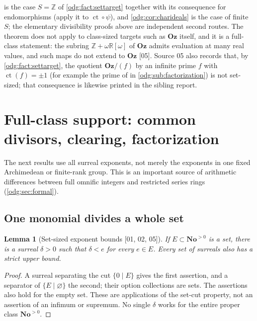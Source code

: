 \documentclass[11pt,oneside]{article}
\numberwithin{equation}{section}
\newtheorem{lemma}[lemma]{Lemma}
\theoremstyle{definition}
\theoremstyle{remark}
\newcommand{\No}{\mathbf{No}}
\newcommand{\Oz}{\mathbf{Oz}}
\newcommand{\Z}{\mathbb Z}
\newcommand{\R}{\mathbb R}
\newcommand{\ct}{\operatorname{ct}}
\newcommand{\src}[1]{\textup{\textsf{\small[#1]}}}
\begin{document}
 is the case $S=\Z$ of \cref{odg:fact:settarget}
together with its consequence for endomorphisms (apply it to
$\ct\circ\psi$), and \cref{odg:cor:charideals} is the case of finite $S$;
the elementary divisibility proofs above are independent second routes. The
theorem does not apply to class-sized targets such as $\Oz$ itself, and it is
a full-class statement: the subring $\Z+\omega\R[\omega]$ of $\Oz$ admits
evaluation at many real values, and such maps do not extend to $\Oz$
\src{05}. Source 05 also records that, by \cref{odg:fact:settarget}, the
quotient $\Oz/(f)$ by an infinite prime $f$ with $\ct(f)=\pm1$ (for example
the prime of \cite[Theorem B]{LM} in \cref{odg:sub:factorization}) is not
set-sized; that consequence is likewise printed in the sibling report.

\section{Full-class support: common divisors, clearing, factorization}\label{odg:sec:class}

The next results use all surreal exponents, not merely the exponents in one
fixed Archimedean or finite-rank group. This is an important source of
arithmetic differences between full omnific integers and restricted series
rings (\cref{odg:sec:formal}).

\subsection{One monomial divides a whole set}

\begin{lemma}[Set-sized exponent bounds \src{01, 02, 05}]\label{odg:lem:setbounds}
If $E\subset\No^{>0}$ is a set, there is a surreal $\delta>0$ such
that $\delta<e$ for every $e\in E$. Every set of surreals also has a
strict upper bound.
\end{lemma}
\begin{proof}
A surreal separating the cut $\{0\mid E\}$ gives the first assertion, and
a separator of $\{E\mid\varnothing\}$ the second; their option collections
are sets. The assertions also hold for the empty set. These are applications
of the set-cut property, not an assertion of an infimum or supremum. No
single $\delta$ works for the entire proper class $\No^{>0}$.
\end{proof}
\end{document}

